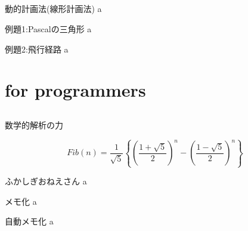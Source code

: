 \documentclass{beamer}
\begin{document}
\subsection{}

\begin{frame}[fragile]{動的計画法(線形計画法)}{}
a
\end{frame}

\begin{frame}[fragile]{例題1:Pascalの三角形}{}
a
\end{frame}

\begin{frame}[fragile]{例題2:飛行経路}{}
a
\end{frame}


\section{for programmers}		%
\subsection{}

\begin{frame}[fragile]{数学的解析の力}{}

\[
Fib(n) = \frac{1}{\sqrt{5}}
\left\{
\left(\frac{1 + \sqrt{5}}{2}\right)^n
-
\left(\frac{1 - \sqrt{5}}{2}\right)^n
\right\}
\]

\end{frame}

\begin{frame}[fragile]{ふかしぎおねえさん}{}
a
\end{frame}

\begin{frame}[fragile]{メモ化}{}
a
\end{frame}

\begin{frame}[fragile]{自動メモ化}{}
a
\end{frame}
\end{document}
